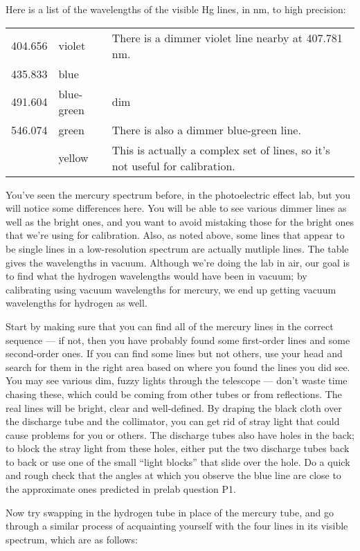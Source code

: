 Here is a list of the wavelengths of the visible Hg lines, in nm, to high precision:

\begin{tabular}{llp{40mm}}
404.656  & violet & There is a dimmer violet line nearby at 407.781 nm.\\
435.833  & blue & \\
491.604  & blue-green & dim \\
546.074  & green & There is also a dimmer blue-green line.\\
           & yellow & This is actually a complex set of lines, so it's not useful for calibration.
\end{tabular}

You've seen the mercury spectrum before, in the photoelectric effect lab, but you will
notice some differences here. You will be able to see various dimmer lines as well as the bright ones,
and you want to avoid mistaking those for the bright ones that we're using for calibration.
Also, as noted above, some lines that appear to be single lines in a low-resolution spectrum 
are actually mutliple lines.
The table gives the wavelengths in vacuum. Although we're doing the lab in air, our goal is to find
what the hydrogen wavelengths would have been in vacuum; by calibrating using vacuum wavelengths
for mercury, we end up getting vacuum wavelengths for hydrogen as well.

Start by making sure
that you can find all of the mercury lines in the correct sequence --- if
not, then you have probably found some first-order
lines and some second-order ones. If you can find some lines
but not others, use your head and search for them in the
right area based on where you found the lines you did see.
You may see various dim, fuzzy lights through the telescope
--- don't waste time chasing these, which could be coming
from other tubes or from reflections. The real lines will be
bright, clear and well-defined. By draping the black cloth over
the discharge tube and the collimator, you can get rid of stray
light that could cause problems for you or others. The discharge tubes also have
holes in the back; to block the stray
light from these holes, either put the two discharge tubes back
to back or use one of the small ``light blocks'' that slide over the hole. Do
a quick and rough check that the angles at which you observe the blue
line are close to the approximate ones predicted in prelab question P1.

Now try swapping in the hydrogen tube in place of the mercury tube, and go through
a similar process of acquainting yourself with the four lines in its visible spectrum, which are as
follows:

